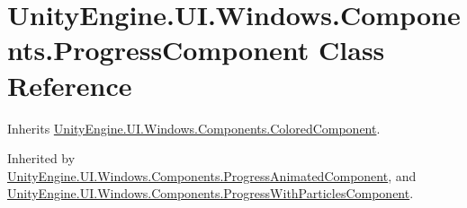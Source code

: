 \hypertarget{class_unity_engine_1_1_u_i_1_1_windows_1_1_components_1_1_progress_component}{}\section{Unity\+Engine.\+U\+I.\+Windows.\+Components.\+Progress\+Component Class Reference}
\label{class_unity_engine_1_1_u_i_1_1_windows_1_1_components_1_1_progress_component}


Inherits \hyperlink{class_unity_engine_1_1_u_i_1_1_windows_1_1_components_1_1_colored_component}{Unity\+Engine.\+U\+I.\+Windows.\+Components.\+Colored\+Component}.



Inherited by \hyperlink{class_unity_engine_1_1_u_i_1_1_windows_1_1_components_1_1_progress_animated_component}{Unity\+Engine.\+U\+I.\+Windows.\+Components.\+Progress\+Animated\+Component}, and \hyperlink{class_unity_engine_1_1_u_i_1_1_windows_1_1_components_1_1_progress_with_particles_component}{Unity\+Engine.\+U\+I.\+Windows.\+Components.\+Progress\+With\+Particles\+Component}.

